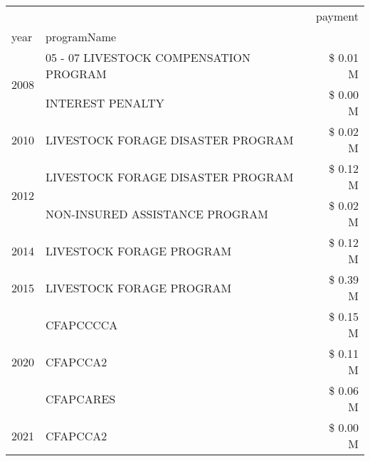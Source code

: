 \begin{tabular}{llr}
\toprule
 &  & payment \\
year & programName &  \\
\midrule
\multirow[t]{2}{*}{2008} & 05 - 07 LIVESTOCK COMPENSATION PROGRAM & \$ 0.01 M \\
 & INTEREST PENALTY & \$ 0.00 M \\
\cline{1-3}
2010 & LIVESTOCK FORAGE DISASTER  PROGRAM & \$ 0.02 M \\
\cline{1-3}
\multirow[t]{2}{*}{2012} & LIVESTOCK FORAGE DISASTER PROGRAM & \$ 0.12 M \\
 & NON-INSURED ASSISTANCE PROGRAM & \$ 0.02 M \\
\cline{1-3}
2014 & LIVESTOCK FORAGE PROGRAM & \$ 0.12 M \\
\cline{1-3}
2015 & LIVESTOCK FORAGE PROGRAM & \$ 0.39 M \\
\cline{1-3}
\multirow[t]{3}{*}{2020} & CFAPCCCCA & \$ 0.15 M \\
 & CFAPCCA2 & \$ 0.11 M \\
 & CFAPCARES & \$ 0.06 M \\
\cline{1-3}
2021 & CFAPCCA2 & \$ 0.00 M \\
\cline{1-3}
\bottomrule
\end{tabular}
